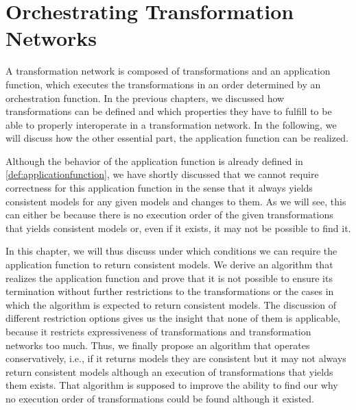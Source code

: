 \chapter{Orchestrating Transformation Networks 
}
\label{chap:orchestration}


A transformation network is composed of transformations and an application function, which executes the transformations in an order determined by an orchestration function.
In the previous chapters, we discussed how transformations can be defined and which properties they have to fulfill to be able to properly interoperate in a transformation network.
In the following, we will discuss how the other essential part, the application function can be realized.

Although the behavior of the application function is already defined in \autoref{def:applicationfunction}, we have shortly discussed that we cannot require correctness for this application function in the sense that it always yields consistent models for any given models and changes to them.
As we will see, this can either be because there is no execution order of the given transformations that yields consistent models or, even if it exists, it may not be possible to find it.

In this chapter, we will thus discuss under which conditions we can require the application function to return consistent models.
We derive an algorithm that realizes the application function and prove that it is not possible to ensure its termination without further restrictions to the transformations or the cases in which the algorithm is expected to return consistent models.
The discussion of different restriction options gives us the insight that none of them is applicable, because it restricts expressiveness of transformations and transformation networks too much.
Thus, we finally propose an algorithm that operates conservatively, i.e., if it returns models they are consistent but it may not always return consistent models although an execution of transformations that yields them exists.
That algorithm is supposed to improve the ability to find our why no execution order of transformations could be found although it existed.

